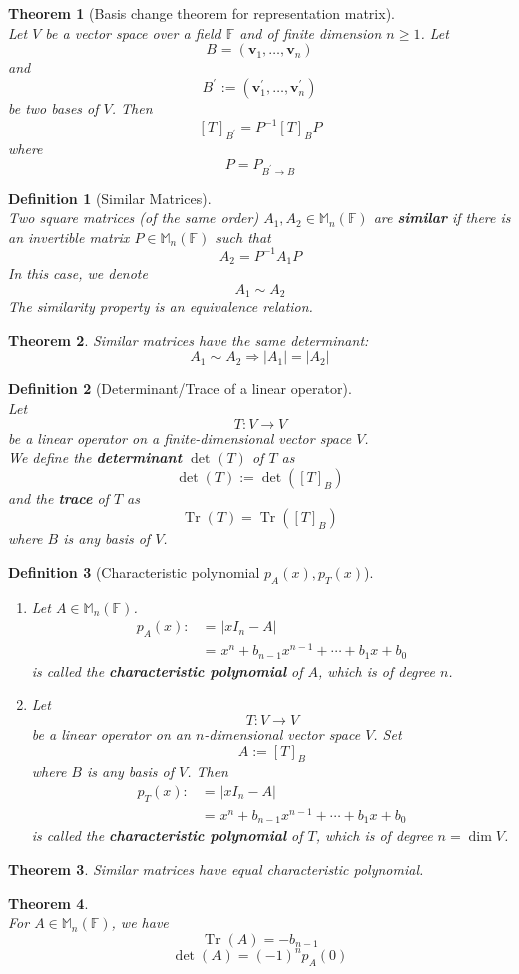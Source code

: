\documentclass[12pt]{article}
\DeclareMathOperator{\Tr}{Tr}
\newtheorem{definition}{Definition}[section]
\newtheorem{theorem}{Theorem}[section]
\theoremstyle{definition}
\begin{document}
\begin{theorem}[Basis change theorem for representation matrix]
\hfill\\\normalfont Let $V$ be a vector space over a field $\mathbb{F}$ and of finite dimension $n\geq 1$. Let
\[
B=(\mathbf{v}_1,\ldots,\mathbf{v}_n)
\]
and
\[
B^\prime:=(\mathbf{v}^\prime_1,\ldots,\mathbf{v}^\prime_n)
\]
be two bases of $V$. Then
\[
[T]_{B^\prime} = P^{-1}[T]_BP
\]
where
\[
P=P_{B^\prime\to B}
\]
\end{theorem}
\begin{definition}[Similar Matrices]
\hfill\\\normalfont Two square matrices (of the same order) $A_1, A_2\in\mathbb{M}_n(\mathbb{F})$ are \textbf{similar} if there is an invertible matrix $P\in\mathbb{M}_n(\mathbb{F})$ such that
\[
A_2 =P^{-1}A_1P
\]
In this case, we denote
\[
A_1\sim A_2
\]
The similarity property is an equivalence relation.
\end{definition}
\begin{theorem}\normalfont Similar matrices have the same determinant:
\[
A_1\sim A_2\Rightarrow |A_1|=|A_2|
\]
\end{theorem}
\begin{definition}[Determinant/Trace of a linear operator]
\hfill\\\normalfont Let
\[
T:V\to V
\]
be a linear operator on a finite-dimensional vector space $V$.\\
We define the \textbf{determinant} $\det(T)$ of $T$ as 
\[
\det(T):=\det([T]_B)
\]
and the \textbf{trace} of $T$ as
\[
\Tr(T)=\Tr([T]_B)
\]
where $B$ is any basis of $V$.
\end{definition}
\begin{definition}[Characteristic polynomial $p_A(x),p_T(x)$]
\normalfont
\begin{enumerate}[label=(\arabic*)]
\item Let $A\in\mathbb{M}_n(\mathbb{F})$.
\[
\begin{aligned}
p_A(x):&=|xI_n-A|\\
&=x^n+b_{n-1}x^{n-1}+\cdots+b_1x+b_0
\end{aligned}
\]
is called the \textbf{characteristic polynomial} of $A$, which is of degree $n$.
\item Let 
\[
T:V\to V
\]
be a linear operator on an $n$-dimensional vector space $V$. Set
\[
A:=[T]_B
\]
where $B$ is any basis of $V$. Then
\[
\begin{aligned}
p_T(x):&=|xI_n-A|\\
&=x^n+b_{n-1}x^{n-1}+\cdots+b_1x+b_0
\end{aligned}
\]
is called the \textbf{characteristic polynomial} of $T$, which is of degree $n=\dim V$.
\end{enumerate}
\end{definition}
\begin{theorem}\normalfont Similar matrices have equal characteristic polynomial.
\end{theorem}
\begin{theorem}
\hfill\\\normalfont For $A\in\mathbb{M}_n(\mathbb{F})$, we have
\[
\Tr(A)=-b_{n-1}
\]
\[
\det(A)=(-1)^np_A(0)
\]
\end{theorem}
\clearpage
\end{document}
